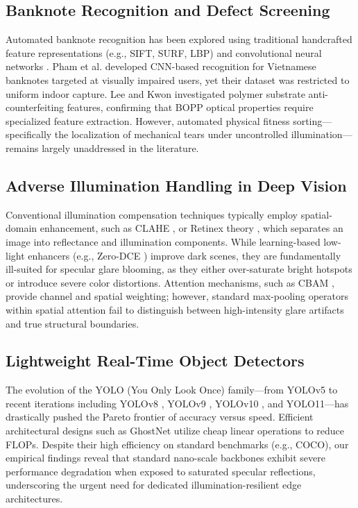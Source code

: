 \documentclass[twocolumn]{svjour3}
\begin{document}
\subsection{Banknote Recognition and Defect Screening}
Automated banknote recognition has been explored using traditional handcrafted feature representations (e.g., SIFT, SURF, LBP) and convolutional neural networks \cite{khandokar2021banknote}. Pham et al. \cite{pham2019vietnamese} developed CNN-based recognition for Vietnamese banknotes targeted at visually impaired users, yet their dataset was restricted to uniform indoor capture. Lee and Kwon \cite{lee2017fake} investigated polymer substrate anti-counterfeiting features, confirming that BOPP optical properties require specialized feature extraction. However, automated physical fitness sorting—specifically the localization of mechanical tears under uncontrolled illumination—remains largely unaddressed in the literature.

\subsection{Adverse Illumination Handling in Deep Vision}
Conventional illumination compensation techniques typically employ spatial-domain enhancement, such as CLAHE \cite{zuiderveld1994contrast}, or Retinex theory \cite{land1977retinex}, which separates an image into reflectance and illumination components. While learning-based low-light enhancers (e.g., Zero-DCE \cite{guo2020zero}) improve dark scenes, they are fundamentally ill-suited for specular glare blooming, as they either over-saturate bright hotspots or introduce severe color distortions. Attention mechanisms, such as CBAM \cite{woo2018cbam}, provide channel and spatial weighting; however, standard max-pooling operators within spatial attention fail to distinguish between high-intensity glare artifacts and true structural boundaries.

\subsection{Lightweight Real-Time Object Detectors}
The evolution of the YOLO (You Only Look Once) family—from YOLOv5 to recent iterations including YOLOv8 \cite{jocher2023ultralytics}, YOLOv9 \cite{wang2024yolov9}, YOLOv10 \cite{wang2024yolov10}, and YOLO11—has drastically pushed the Pareto frontier of accuracy versus speed. Efficient architectural designs such as GhostNet \cite{han2020ghostnet} utilize cheap linear operations to reduce FLOPs. Despite their high efficiency on standard benchmarks (e.g., COCO), our empirical findings reveal that standard nano-scale backbones exhibit severe performance degradation when exposed to saturated specular reflections, underscoring the urgent need for dedicated illumination-resilient edge architectures.
\end{document}
